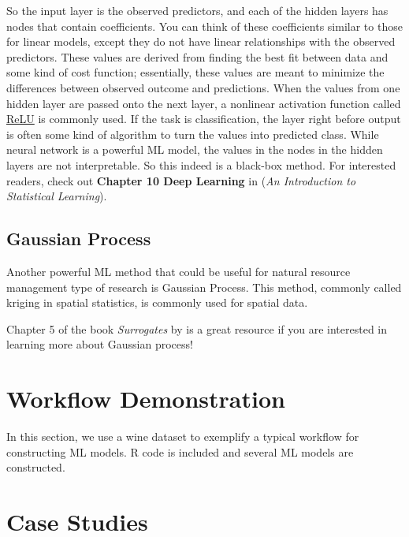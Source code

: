 \documentclass[
]{book}
\begin{document}
So the input layer is the observed predictors, and each of the hidden layers has nodes that contain coefficients. You can think of these coefficients similar to those for linear models, except they do not have linear relationships with the observed predictors. These values are derived from finding the best fit between data and some kind of cost function; essentially, these values are meant to minimize the differences between observed outcome and predictions. When the values from one hidden layer are passed onto the next layer, a nonlinear activation function called \href{https://en.wikipedia.org/wiki/Rectifier_(neural_networks)}{ReLU} is commonly used. If the task is classification, the layer right before output is often some kind of algorithm to turn the values into predicted class. While neural network is a powerful ML model, the values in the nodes in the hidden layers are not interpretable. So this indeed is a black-box method. For interested readers, check out \textbf{Chapter 10 Deep Learning} in \citet{james2013introduction} (\emph{An Introduction to Statistical Learning}).

\hypertarget{gaussian-process}{%
\section{Gaussian Process}\label{gaussian-process}}

Another powerful ML method that could be useful for natural resource management type of research is Gaussian Process. This method, commonly called kriging in spatial statistics, is commonly used for spatial data.

Chapter 5 of the book \emph{Surrogates} by \citet{gramacy2020surrogates} is a great resource if you are interested in learning more about Gaussian process!

\hypertarget{workflow-demonstration}{%
\chapter{Workflow Demonstration}\label{workflow-demonstration}}

In this section, we use a wine dataset to exemplify a typical workflow for constructing ML models. R code is included and several ML models are constructed.

\hypertarget{case-studies}{%
\chapter{Case Studies}\label{case-studies}}
\end{document}
